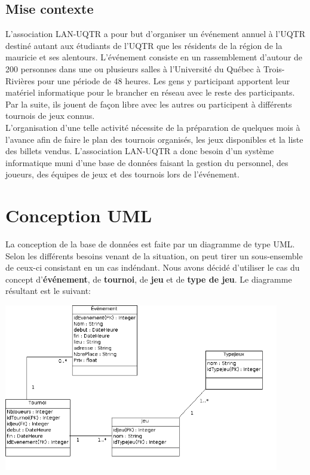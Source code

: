 \documentclass[11pt,french]{article}
\begin{document}
        \subsection*{Mise contexte} %
        \label{sub:mise-en-contexte}
            L'association LAN-UQTR a pour but d'organiser un événement annuel à l'UQTR destiné autant aux
            étudiants de l'UQTR que les résidents de la région de la mauricie et ses alentours. L'événement
            consiste en un rassemblement d'autour de 200 personnes dans une ou plusieurs salles à l'Université
            du Québec à Trois-Rivières pour une période de 48 heures. Les gens y participant apportent leur matériel
            informatique pour le brancher en réseau avec le reste des participants. Par la suite, ils jouent de façon
            libre avec les autres ou participent à différents tournois de jeux connus.\\

            L'organisation d'une telle activité nécessite de la préparation de quelques mois à l'avance afin de faire
            le plan des tournois organisés, les jeux disponibles et la liste des billets vendus. L'association LAN-UQTR
            a donc besoin d'un système informatique muni d'une base de données faisant la gestion du personnel, des joueurs,
            des équipes de jeux et des tournois lors de l'événement.
    \newpage

    \section{Conception UML} %
    \label{sec:concep-uml}
        La conception de la base de données est faite par un diagramme de type UML. Selon les différents besoins venant
        de la situation, on peut tirer un sous-ensemble de ceux-ci consistant en un cas indéndant. Nous avons décidé
        d'utiliser le cas du concept d'{\bf événement}, de {\bf tournoi}, de {\bf jeu} et de {\bf type de jeu}. Le diagramme résultant est le suivant:
        \begin{center}
            \includegraphics[width=12cm]{../../conception/DiagrammeUML-simdan.png}
        \end{center}
\end{document}

